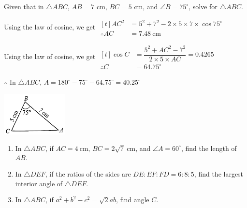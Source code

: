 \documentclass{report}
\begin{document}
    \begin{question}
        Given that in $\triangle ABC$, $AB = 7$ cm, $BC = 5$ cm, and $\angle B = 75^\circ$, solve for $\triangle ABC$.

        \sol{}
        \begin{vwcol}[widths={0.6,0.4}, sep=8mm, rule=0pt,justify=flushleft]
            \noindent Using the law of cosine, we get $\begin{aligned}[t] A C^2 & =5^2+7^2-2 \times 5 \times 7 \times \cos 75^{\circ} \\ \therefore A C & =7.48 \mathrm{~cm}\end{aligned}$

            \vspace{0.5em}
            \noindent Using the law of cosine, we get $\begin{aligned}[t] \cos C&=\dfrac{5^2+A C^2-7^2}{2 \times 5 \times A C}=0.4265 \\ \therefore C&=64.75^{\circ}\end{aligned}$

            \vspace{0.5em}
            \noindent $\therefore$ In $\triangle A B C$, $A=180^{\circ}-75^{\circ}-64.75^{\circ}=40.25^{\circ}$

            \vspace{3em}    
            \includegraphics[width=0.25\textwidth]{assets/10-24.jpg}
        \end{vwcol}
        \vspace{-1em}
    \end{question}

    \vspace{-2em}
    \begin{enumerate}
        \item In $\triangle ABC$, if $AC = 4 \mathrm{~cm}$, $BC = 2\sqrt{7} \mathrm{~cm}$, and $\angle A = 60^\circ$, find the length of $AB$.

        \item In $\triangle DEF$, if the ratios of the sides are $DE : EF : FD = 6 : 8 : 5$, find the largest interior angle of $\triangle DEF$.

        \item In $\triangle ABC$, if $a^2 + b^2 - c^2 = \sqrt{2}ab$, find angle $C$.
    \end{enumerate}
\end{document}
